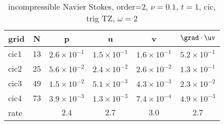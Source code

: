 \begin{table}[hbt]
\begin{center}
\begin{tabular}{|l|c|c|c|c|c|} \hline\hline 
grid  & N &  p &  u & v & $\grad\cdot\uv$\\ \hline 
                cic1 &    13 &  $2.6\times10^{ -1}$  &  $1.5\times10^{ -1}$  &  $1.6\times10^{ -1}$  &  $5.2\times10^{ -1}$   \\ \hline
                cic2 &    25 &  $5.6\times10^{ -2}$  &  $2.4\times10^{ -2}$  &  $2.6\times10^{ -2}$  &  $1.3\times10^{ -1}$   \\ \hline
                cic3 &    49 &  $1.5\times10^{ -2}$  &  $5.1\times10^{ -3}$  &  $4.3\times10^{ -3}$  &  $2.3\times10^{ -2}$   \\ \hline
                cic4 &    73 &  $3.9\times10^{ -3}$  &  $1.3\times10^{ -3}$  &  $7.4\times10^{ -4}$  &  $4.9\times10^{ -3}$   \\ \hline
    rate            &     &       $2.4$ &       $2.7$ &       $3.0$ &       $2.7$  \\ \hline\hline
\end{tabular}
\caption{incompressible Navier Stokes, order=$2$, $\nu=0.1$, $t=1$, cic, trig TZ, $\omega=2$}\label{table:ins.cic}
\end{center}
\end{table}

